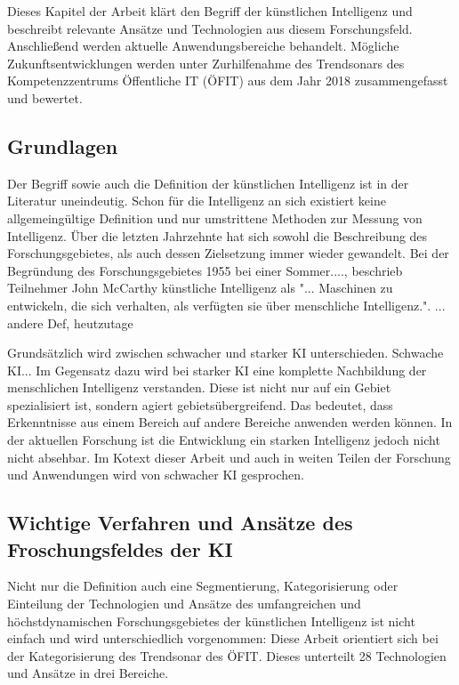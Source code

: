 \documentclass[a4paper,12pt, german]{report}
\begin{document}
Dieses Kapitel der Arbeit klärt den Begriff der künstlichen Intelligenz und beschreibt relevante Ansätze und Technologien aus diesem Forschungsfeld. Anschließend werden aktuelle Anwendungsbereiche behandelt. Mögliche Zukunftsentwicklungen werden unter Zurhilfenahme des Trendsonars des Kompetenzzentrums Öffentliche IT (ÖFIT) aus dem Jahr 2018 zusammengefasst und bewertet. 

\subsection{Grundlagen}

Der Begriff sowie auch die Definition der künstlichen Intelligenz ist in der Literatur uneindeutig. Schon für die Intelligenz an sich existiert keine allgemeingültige Definition und nur umstrittene Methoden zur Messung von Intelligenz. Über die letzten Jahrzehnte hat sich sowohl die Beschreibung des Forschungsgebietes, als auch dessen Zielsetzung immer wieder gewandelt. Bei der Begründung des Forschungsgebietes 1955 bei einer Sommer...., beschrieb Teilnehmer John McCarthy künstliche Intelligenz als "... Maschinen zu entwickeln, die sich verhalten, als verfügten sie über menschliche Intelligenz.".
... andere Def, heutzutage
 \cite{01}  %

Grundsätzlich wird zwischen schwacher und starker KI unterschieden. Schwache KI... 
Im Gegensatz dazu wird bei starker KI eine komplette Nachbildung der menschlichen Intelligenz verstanden. Diese ist nicht nur auf ein Gebiet spezialisiert ist, sondern agiert gebietsübergreifend. Das bedeutet, dass Erkenntnisse aus einem Bereich auf andere Bereiche anwenden werden können. In der aktuellen Forschung ist die Entwicklung ein starken Intelligenz jedoch nicht nicht absehbar. 
Im Kotext dieser Arbeit und auch in weiten Teilen der Forschung und Anwendungen wird von schwacher KI gesprochen.

\subsection{Wichtige Verfahren und Ansätze des Froschungsfeldes der KI}

Nicht nur die Definition auch eine Segmentierung, Kategorisierung oder Einteilung der Technologien und Ansätze des umfangreichen und höchstdynamischen Forschungsgebietes der künstlichen Intelligenz ist nicht einfach und wird unterschiedlich vorgenommen:
Diese Arbeit orientiert sich bei der Kategorisierung des Trendsonar des ÖFIT. Dieses unterteilt 28 Technologien und Ansätze in drei Bereiche.  
\end{document}
